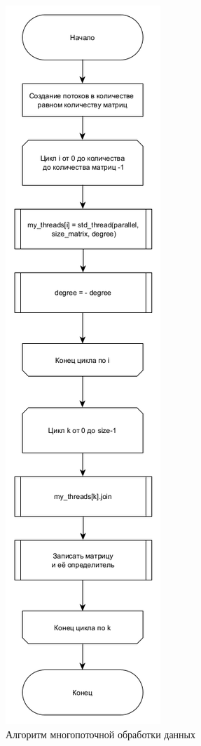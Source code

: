 \clearpage
\begin{figure}[h]
	\centering
	\includegraphics[height=0.8\textheight]{img/parallel.png}
	\caption{Алгоритм многопоточной обработки данных}
    \label{fig:parallel}
\end{figure}



